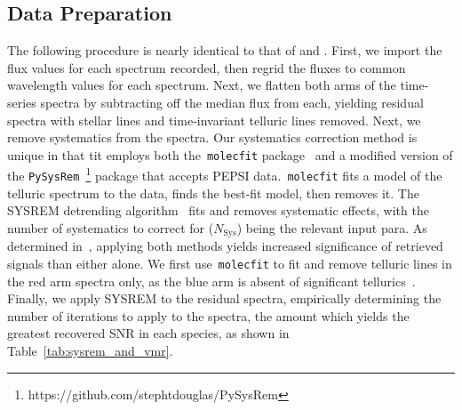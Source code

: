\documentclass[twocolumn]{aastex631}
\newcommand{\code}[1]{\texttt{#1}}
\begin{document}
        \subsection{Data Preparation}\label{subsec:Data Preparation}
            The following procedure is nearly identical to that of \citet{Johnson2023} and \citet{Petz2023}. First, we import the flux values for each spectrum recorded, then regrid the fluxes to common wavelength values for each spectrum. Next, we flatten both arms of the time-series spectra by subtracting off the median flux from each, yielding residual spectra with stellar lines and time-invariant telluric lines removed. Next, we remove systematics from the spectra. Our systematics correction method is unique in that tit employs both the~\code{molecfit} package~\citep{Smette2015, Kausch2015} and a modified version of the \code{PySysRem}~\footnote{https://github.com/stephtdouglas/PySysRem} package that accepts PEPSI data.~\code{molecfit} fits a model of the telluric spectrum to the data, finds the best-fit model, then removes it. The SYSREM detrending algorithm~\citep{Tamuz2005} fits and removes systematic effects, with the number of systematics to correct for ($N_{\mathrm{Sys}}$) being the relevant input para. As determined in~\citet{Johnson2023}, applying both methods yields increased significance of retrieved signals than either alone. We first use~\code{molecfit} to fit and remove telluric lines in the red arm spectra only, as the blue arm is absent of significant tellurics~\citep{Smette2015}. Finally, we apply SYSREM to the residual spectra, empirically determining the number of iterations to apply to the spectra, the amount which yields the greatest recovered SNR in each species, as shown in Table~\ref{tab:sysrem_and_vmr}.
 
\end{document}
